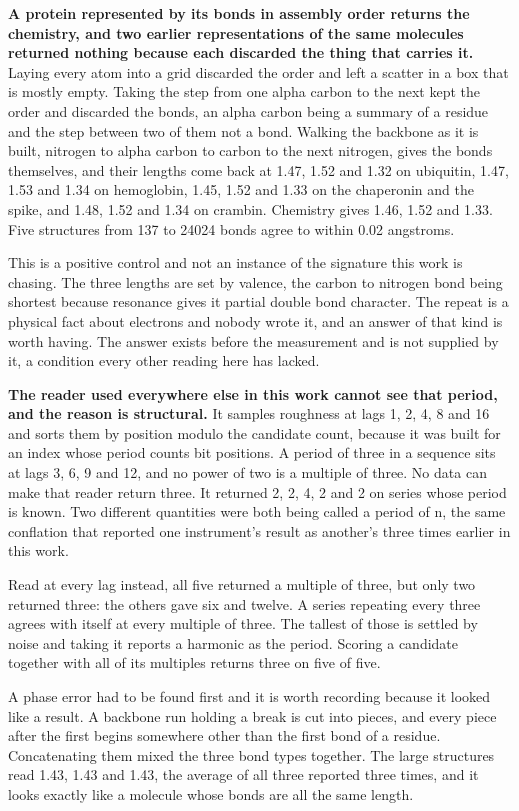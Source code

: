 \textbf{A protein represented by its bonds in assembly order returns the chemistry, and two earlier representations of the same molecules returned nothing because each discarded the thing that carries it.} Laying every atom into a grid discarded the order and left a scatter in a box that is mostly empty. Taking the step from one alpha carbon to the next kept the order and discarded the bonds, an alpha carbon being a summary of a residue and the step between two of them not a bond. Walking the backbone as it is built, nitrogen to alpha carbon to carbon to the next nitrogen, gives the bonds themselves, and their lengths come back at 1.47, 1.52 and 1.32 on ubiquitin, 1.47, 1.53 and 1.34 on hemoglobin, 1.45, 1.52 and 1.33 on the chaperonin and the spike, and 1.48, 1.52 and 1.34 on crambin. Chemistry gives 1.46, 1.52 and 1.33. Five structures from 137 to 24024 bonds agree to within 0.02 angstroms.

This is a positive control and not an instance of the signature this work is chasing. The three lengths are set by valence, the carbon to nitrogen bond being shortest because resonance gives it partial double bond character. The repeat is a physical fact about electrons and nobody wrote it, and an answer of that kind is worth having. The answer exists before the measurement and is not supplied by it, a condition every other reading here has lacked.

\textbf{The reader used everywhere else in this work cannot see that period, and the reason is structural.} It samples roughness at lags 1, 2, 4, 8 and 16 and sorts them by position modulo the candidate count, because it was built for an index whose period counts bit positions. A period of three in a sequence sits at lags 3, 6, 9 and 12, and no power of two is a multiple of three. No data can make that reader return three. It returned 2, 2, 4, 2 and 2 on series whose period is known. Two different quantities were both being called a period of n, the same conflation that reported one instrument's result as another's three times earlier in this work.

Read at every lag instead, all five returned a multiple of three, but only two returned three: the others gave six and twelve. A series repeating every three agrees with itself at every multiple of three. The tallest of those is settled by noise and taking it reports a harmonic as the period. Scoring a candidate together with all of its multiples returns three on five of five.

A phase error had to be found first and it is worth recording because it looked like a result. A backbone run holding a break is cut into pieces, and every piece after the first begins somewhere other than the first bond of a residue. Concatenating them mixed the three bond types together. The large structures read 1.43, 1.43 and 1.43, the average of all three reported three times, and it looks exactly like a molecule whose bonds are all the same length.

